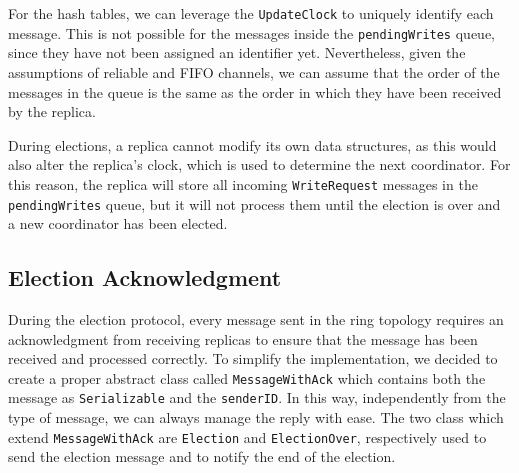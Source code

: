 For the hash tables, we can leverage the \texttt{UpdateClock} to uniquely identify each message.
This is not possible for the messages inside the \texttt{pendingWrites} queue, since they have not been assigned an identifier yet.
Nevertheless, given the assumptions of reliable and FIFO channels, we can assume that the order of the messages in the queue is the same as the order in which they have been received by the replica.

During elections, a replica cannot modify its own data structures, 
as this would also alter the replica's clock, which is used to determine the next coordinator.
For this reason, the replica will store all incoming \texttt{WriteRequest} messages in the \texttt{pendingWrites} queue, but it will not process them until the election is over and a new coordinator has been elected.

\subsection{Election Acknowledgment}
During the election protocol, every message sent in the ring topology requires an acknowledgment 
from receiving replicas to ensure that the message has been received and processed correctly.
To simplify the implementation, we decided to create a proper abstract class called \texttt{MessageWithAck} 
which contains both the message as \texttt{Serializable} and the \texttt{senderID}.
In this way, independently from the type of message, we can always manage
the reply with ease.
The two class which extend \texttt{MessageWithAck} are \texttt{Election} and \texttt{ElectionOver},
respectively used to send the election message and to notify the end of the election.
